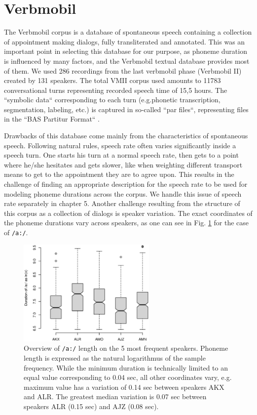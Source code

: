 \documentclass[a4paper]{scrreprt}
\begin{document}
\section{Verbmobil}
The Verbmobil corpus is a database of spontaneous speech containing a collection of appointment making dialogs, fully transliterated and annotated. This was an important point in selecting this database for our purpose, as phoneme duration is influenced by many factors, and the Verbmobil textual database provides most of them. We used 286 recordings from the last verbmobil phase (Verbmobil II) created by 131 speakers. The total VMII corpus used amounts to 11783 conversational turns representing recorded speech time of 15,5 hours. The ``symbolic data`` corresponding to each turn (e.g.phonetic transcription, segmentation, labeling, etc.) is captured in so-called ``par files``, representing files in the ``BAS Partitur Format`` \cite{Burger2000}. 

Drawbacks of this database come mainly from the characteristics of spontaneous speech. Following natural rules, speech rate often varies significantly inside a speech turn. One starts his turn at a normal speech rate, then gets to a point where he/she hesitates and gets slower, like when weighting different transport means to get to the appointment they are to agree upon. This results in the challenge of finding an appropriate description for the speech rate to be used for modeling phoneme durations across the corpus. We handle this issue of speech rate separately in chapter 5. Another challenge resulting from the structure of this corpus as a collection of dialogs is speaker variation. The exact coordinates of the phoneme durations vary across speakers, as one can see in Fig. \ref{fig:speaker_cmp} for the case of \texttt{/a:/}.

\begin{figure}[htbp]
	\includegraphics[width=0.6\textwidth]{../Graphen/Duration_of_a_5speakers.eps}
	\centering
	\caption[Phoneme length variation between speakers]{Overview of \texttt{/a:/} length on the 5 most frequent speakers. Phoneme length is expressed as the natural logarithmus of the sample frequency. While the minimum duration is technically limited to an equal value corresponding to 0.04 sec, all other coordinates vary, e.g. maximum value has a variation of 0.14 sec between speakers AKX and ALR. The greatest median variation is 0.07 sec between speakers ALR (0.15 sec) and AJZ (0.08 sec).}
	\label{fig:speaker_cmp}
\end{figure}
\end{document}
